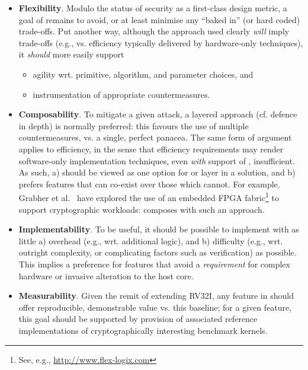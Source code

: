 \begin{itemize}
\begin{itemize}
      \item {\bf      Flexibility}. 
            Modulo the status of security as a first-class design metric, a
            goal of \XCID remains to avoid, or at least minimise any ``baked 
            in'' (or hard coded) trade-offs.  Put another way, although the 
            approach used clearly {\em will} imply trade-offs 
            (e.g., vs. efficiency typically delivered by hardware-only techniques), 
            it {\em should} more easily support

            \begin{itemize}
            \item agility wrt. primitive, algorithm, and parameter choices,
                  and
            \item instrumentation of appropriate countermeasures.
            \end{itemize}

      \item {\bf    Composability}.
            To mitigate a given attack, a layered approach (cf. defence in 
            depth) is normally preferred: this favours the use of multiple
            countermeasures, vs. a single, perfect panacea.  The same form
            of argument applies to efficiency, in the sense that efficiency 
            requirements may render software-only implementation techniques,
            even {\em with} support of \XCID, insufficient.
            As such, \XCID
            a) should be viewed as one option for or layer in a solution,
               and
            b) prefers features that can co-exist over those which cannot.
            For example, 
            Grabher et al.~\cite{SCARV:GGHJPTW:11} have explored the use of 
            an embedded FPGA fabric\footnote{
            See, e.g., \url{http://www.flex-logix.com}
            } to support cryptographic workloads: \XCID composes with such 
            an approach.
      \item {\bf Implementability}. 
            To be useful, it should be possible to implement \XCID with as
            little
            a) overhead   (e.g., wrt. additional logic),
               and
            b) difficulty (e.g., wrt. outright complexity, or complicating factors such as verification)
            as possible.  This implies a preference for features that avoid 
            a {\em requirement} for complex hardware or invasive alteration 
            to the host core.

      \item {\bf    Measurability}.
            Given the remit of extending RV32I, any feature in \XCID should 
            offer reproducible, demonstrable value vs. this baseline; for 
            a given feature, this goal should be supported by provision of 
            associated reference implementations of cryptographically 
            interesting benchmark kernels.


\end{itemize}
\end{itemize}

